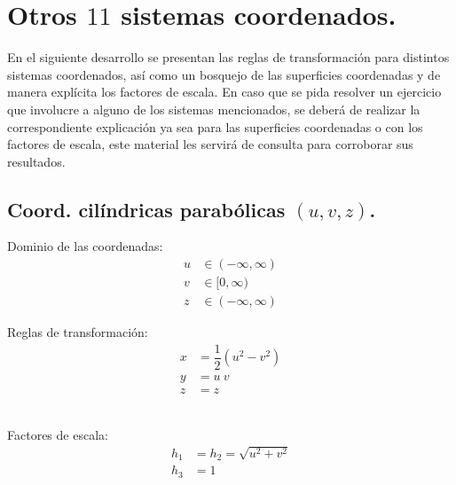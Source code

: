 \documentclass[12pt]{article}
\numberwithin{equation}{section}
\begin{document}
\section{Otros \texorpdfstring{$11$}{11} sistemas coordenados.}

En el siguiente desarrollo se presentan las reglas de transformación para distintos sistemas coordenados, así como un bosquejo de las superficies coordenadas y de manera explícita los factores de escala. En caso que se pida resolver un ejercicio que involucre a alguno de los sistemas mencionados, se deberá de realizar la correspondiente explicación ya sea para las superficies coordenadas o con los factores de escala, este material les servirá de consulta para corroborar sus resultados.

\subsection{Coord. cilíndricas parabólicas \texorpdfstring{$(u, v, z)$}{(u, v, z)}.}

\begin{minipage}{0.45\textwidth}
Dominio de las coordenadas:
\begin{align*}
u &\in (-\infty,\infty) \\
v &\in [0,\infty) \\
z &\in(-\infty,\infty)
\end{align*}
\end{minipage}
\hspace{1cm}
\begin{minipage}{0.4\textwidth}
Reglas de transformación:
\begin{align*}
x &= \dfrac{1}{2}(u^{2 } -v^{2}) \\
y &= u \: v \\
z &=z
\end{align*}
\end{minipage}
\\[0.75em]
Factores de escala:
\begin{align*}
h_{1 } &= h_{2} = \sqrt{u^{2 } +v^{2}} \\
h_{3 } &= 1
\end{align*}
\end{document}
